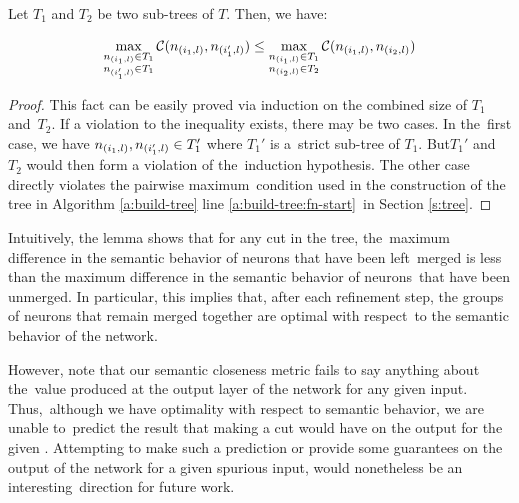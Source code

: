 \begin{lemma}
Let $T_1$ and $T_2$ be two sub-trees of $T$. Then, we have:

\begin{equation*}
\begin{aligned}
    \max_{ \substack{ n_{(i_1,l)} \in T_1 \\ n_{(i_1',l)} \in T_1 }} 
    \mathcal{C}( n_{(i_1,l)}, n_{(i_1',l)} ) \leq
    \max_{ \substack{ n_{(i_1,l)} \in T_1 \\ n_{(i_2,l)} \in T_2 }} 
    \mathcal{C}( n_{(i_1,l)}, n_{(i_2,l)} )
\end{aligned}
\end{equation*}

\end{lemma}
\begin{proof}

    This fact can be easily proved via induction on the combined size of $T_1$ and $T_2$. If a violation to the inequality exists, there may be two cases. In the first case, we have $n_{(i_1,l)}, n_{(i_1',l)} \in T_1'$ where $T_1'$ is a strict sub-tree of $T_1$. But$T_1'$ and $T_2$ would then form a violation of the induction hypothesis. The other case directly violates the pairwise maximum condition used in the construction of the tree in Algorithm \ref{a:build-tree} line \ref{a:build-tree:fn-start} in Section \ref{s:tree}.
\end{proof}

Intuitively, the lemma shows that for any cut in the tree, the maximum difference in the semantic behavior of neurons that have been left merged is less than the maximum difference in the semantic behavior of neurons that have been unmerged. In particular, this implies that, after each refinement
step, the groups of neurons that remain merged together are optimal with respect to the semantic behavior of the network.

However, note that our semantic closeness metric fails to say anything about the value produced at the output layer of the network for any given input. Thus, although we have optimality with respect to semantic behavior, we are unable to predict the result that making a cut would have on the output for the given \gencex. Attempting to make such a prediction or provide some guarantees on the output
of the network for a given spurious input, would nonetheless be an interesting direction for future work.

